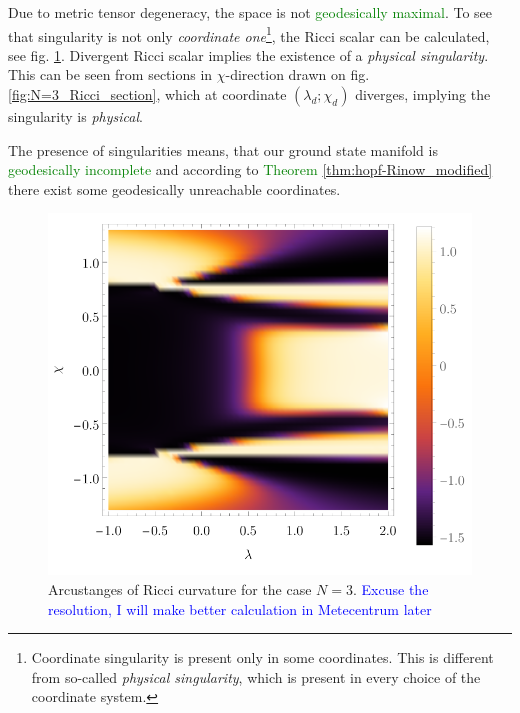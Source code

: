 Due to metric tensor degeneracy, the space is not \textcolor{green}{geodesically maximal}. To see that singularity is not only \emph{coordinate one}\footnote{Coordinate singularity is present only in some coordinates. This is different from so-called \emph{physical singularity}, which is present in every choice of the coordinate system.}, the Ricci scalar can be calculated, see fig. \ref{fig:N=3_Ricci}. Divergent Ricci scalar implies the existence of a \emph{physical singularity}. This can be seen from sections in $\chi$-direction drawn on fig. \ref{fig:N=3_Ricci_section}, which at coordinate $(\lambda_d;\chi_d)$ diverges, implying the singularity is \emph{physical}. 


The presence of singularities means, that our ground state manifold is \textcolor{green}{geodesically incomplete} and according to \textcolor{green}{Theorem} \ref{thm:hopf-Rinow_modified} there exist some geodesically unreachable coordinates.
\begin{figure}[H]
    \centering
    \includegraphics{../img/N=3_Ricci.pdf}
    \caption{Arcustanges of Ricci curvature for the case $N=3$. \textcolor{blue}{Excuse the resolution, I will make better calculation in Metecentrum later}}
    \label{fig:N=3_Ricci}
\end{figure}


